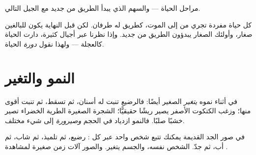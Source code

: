 \begin{omfigure}

{\small مراحل الحياة --- والسهم الذي يبدأ الطريق من جديد مع الجيل
التالي.}
\end{omfigure}

\begin{remark}\label{rem:g2:born-grow-die:wheel}
كل حياة مفردة تجري من  إلى الموت، كطريق له طرفان. لكن قبل
النهاية يكون للبالغين صغار، وأولئك الصغار يبدؤون الطريق من جديد.
وإذا نظرنا عبر أجيال كثيرة، دارت الحياة كالعجلة --- ولهذا نقول
\emph{دورة} الحياة.
\end{remark}

\section{النمو والتغير}

\begin{proposition}\label{prop:g2:born-grow-die:change}
في أثناء نموه \emph{يتغير}  الصغير أيضًا: فالرضيع تنبت
له أسنان، ثم تسقط، ثم تنبت أقوى منها؛ وزغب الكتكوت الأصفر يصير
ريشًا حقيقيًّا؛  الشجرة الصغيرة الطرية الخضراء تصير خشبًا صلبًا.
فالنمو ازدياد في الحجم \emph{وصيرورة} إلى شيء مختلف.
\end{proposition}
\admitted

\begin{example}\label{ex:g2:born-grow-die:photo}
في صور الجد القديمة يمكنك تتبع شخص واحد عبر كل : رضيع، ثم
تلميذ، ثم شاب، ثم أب، ثم جدّ. الشخص نفسه، والجسم يتغير. والصور
آلات زمن صغيرة لمشاهدة .
\end{example}

